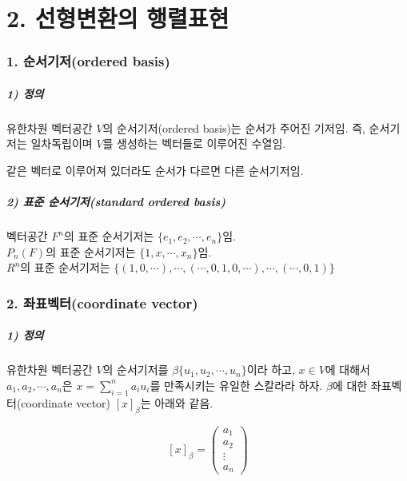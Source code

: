 \newpage


\part*{2. 선형변환의 행렬표현}

\section*{1. 순서기저(ordered basis)}

\subsubsection*{1) 정의\\}
\begin{DEF}
유한차원 벡터공간 $V$의 순서기저(ordered basis)는 순서가 주어진 기저임. 즉, 순서기저는 일차독립이며 $V$를 생성하는 벡터들로 이루어진 수열임.
\end{DEF}

같은 벡터로 이루어져 있더라도 순서가 다르면 다른 순서기저임.

\subsubsection*{2) 표준 순서기저(standard ordered basis)}
벡터공간 $F^n$의 표준 순서기저는 $\{e_1,e_2, \cdots ,e_n\}$임.\\
$P_n(F)$의 표준 순서기저는 $\{1,x, \cdots ,x_n\}$임.\\
$R^n$의 표준 순서기저는 $\{{(1,0, \cdots), \cdots ,(\cdots ,0,1,0, \cdots), \cdots ,(\cdots ,0,1)}\}$


\section*{2. 좌표벡터(coordinate vector)}

\subsubsection*{1) 정의\\}
\begin{DEF}
유한차원 벡터공간 $V$의 순서기저를 $\beta \{u_1,u_2, \cdots ,u_n\}$이라 하고, $x \in V$에 대해서 $a_1,a_2, \cdots ,a_n$은 $x = \sum_{i=1}^{n}{a_{i}u_{i}}$를 만족시키는 유일한 스칼라라 하자. $\beta$에 대한 좌표벡터(coordinate vector) $[x]_{\beta}$는 아래와 같음.

\[
[x]_{\beta} = 
\begin{pmatrix}
a_{1} \\
a_{2} \\
\vdots \\
a_{n}
\end{pmatrix}
\]
\end{DEF}

